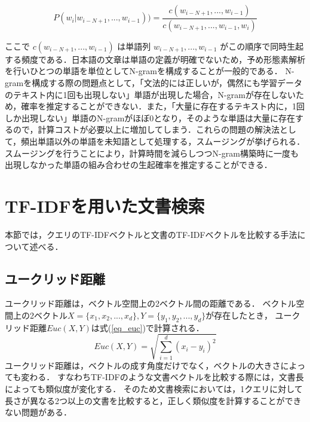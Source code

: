 \begin{equation}
    P(w_i|w_{i-N+1}, ..., w_{i-1})) = \frac{ c(w_{i-N+1}, ..., w_{i-1}) }{ c(w_{i-N+1}, ..., w_{i-1}, w_i) }  
    \label{onkyo_model2}
\end{equation}

ここで $c(w_{i-N+1}, ..., w_{i-1})$ は単語列 $w_{i-N+1}, ..., w_{i-1}$ がこの順序で同時生起する頻度である．日本語の文章は単語の定義が明確でないため，予め形態素解析を行いひとつの単語を単位としてN-gramを構成することが一般的である． 
N-gramを構成する際の問題点として，「文法的には正しいが，偶然にも学習データのテキスト内に1回も出現しない」単語が出現した場合，N-gramが存在しないため，確率を推定することができない．また，「大量に存在するテキスト内に，1回しか出現しない」単語のN-gramがほぼ0となり，そのような単語は大量に存在するので，計算コストが必要以上に増加してしまう．これらの問題の解決法として，頻出単語以外の単語を未知語として処理する，スムージング\cite{ngram_smooth1}が挙げられる．スムージングを行うことにより，計算時間を減らしつつN-gram構築時に一度も出現しなかった単語の組み合わせの生起確率を推定することができる．

%
%


\section{TF-IDFを用いた文書検索} \label{sec_tfidf}
本節では，クエリのTF-IDFベクトルと文書のTF-IDFベクトルを比較する手法について述べる．
\subsection{ユークリッド距離}
ユークリッド距離は，ベクトル空間上の2ベクトル間の距離である．
ベクトル空間上の2ベクトル$X = \{x_1, x_2, ..., x_d\}, Y = \{y_1, y_2, ..., y_d\}$が存在したとき，
ユークリッド距離$Euc(X, Y)$は式(\ref{eq_euc})で計算される．
\begin{equation}
    Euc(X, Y) = \sqrt{\sum^{d}_{i=1}{(x_i - y_i)^2}}    \label{eq_euc}
\end{equation}
ユークリッド距離は，ベクトルの成す角度だけでなく，ベクトルの大きさによっても変わる．
すなわちTF-IDFのような文書ベクトルを比較する際には，文書長によっても類似度が変化する．
そのため文書検索においては，1クエリに対して長さが異なる2つ以上の文書を比較すると，正しく類似度を計算することができない問題がある．

